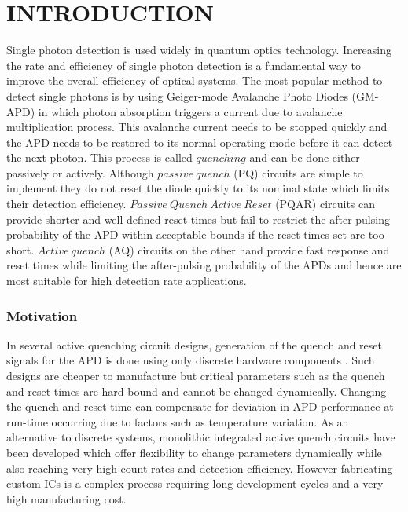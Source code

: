 \section{INTRODUCTION}
Single photon detection is used widely in quantum optics technology. Increasing the rate and efficiency of single photon detection is a fundamental way to improve the overall efficiency of optical systems. The most popular method to detect single photons is by using Geiger-mode Avalanche Photo Diodes (GM-APD) in which photon absorption triggers a current due to avalanche multiplication process. This avalanche current needs to be stopped quickly and the APD needs to be restored to its normal operating mode before it can detect the next photon. This process is called $quenching$ and can be done either passively or actively. Although $passive\ quench$ (PQ) \cite{Cova96, wincomparator} circuits are simple to implement they do not reset the diode quickly to its nominal state which limits their detection efficiency. $Passive\ Quench\ Active\ Reset$ (PQAR) \cite{pqar} circuits can provide shorter and well-defined reset times but fail to restrict the after-pulsing probability of the APD within acceptable bounds if the reset times set are too short. $Active\ quench$ (AQ) \cite{Gallivanoni10} circuits on the other hand provide fast response and reset times while limiting the after-pulsing probability of the APDs and hence are most suitable for high detection rate applications.

\subsubsection*{Motivation}
In several active quenching circuit designs, generation of the quench and reset signals for the APD is done using only discrete hardware components \cite{Ghioni96, Stipcevic09, Stipcevic17}. Such designs are cheaper to manufacture but critical parameters such as the quench and reset times are hard bound and cannot be changed dynamically. Changing the quench and reset time can compensate for deviation in APD performance at run-time occurring due to factors such as temperature variation. As an alternative to discrete systems, monolithic integrated \cite{zappa2000, Acconcia16, 37ps-aq, Ceccarelli2019, Zimmerman5ns} active quench circuits have been developed which offer flexibility to change parameters dynamically while also reaching very high count rates and detection efficiency. However fabricating custom ICs is a complex process requiring long development cycles and a very high manufacturing cost. 


